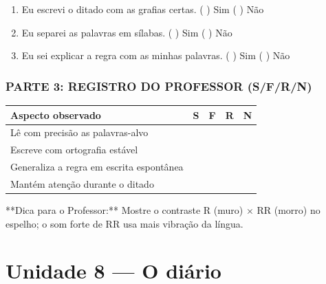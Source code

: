 \begin{exercicio}
\begin{enumerate}[label=\alph*)]
  \item Eu escrevi o ditado com as grafias certas.  \quad ( ) Sim   ( ) Não

  \item Eu separei as palavras em sílabas.  \quad ( ) Sim   ( ) Não

  \item Eu sei explicar a regra com as minhas palavras.  \quad ( ) Sim   ( ) Não

\end{enumerate}

\subsection*{PARTE 3: REGISTRO DO PROFESSOR (S/F/R/N)}

\begin{center}
\renewcommand{\arraystretch}{1.4}
\begin{tabular}{@{}p{9cm}cccc@{}}
\toprule
Aspecto observado & S & F & R & N \\
\midrule
Lê com precisão as palavras-alvo & & & & \\
Escreve com ortografia estável & & & & \\
Generaliza a regra em escrita espontânea & & & & \\
Mantém atenção durante o ditado & & & & \\
\bottomrule\end{tabular}\end{center}

\end{exercicio}

\begin{dica}
**Dica para o Professor:** Mostre o contraste R (muro) × RR (morro) no espelho; o som forte de RR usa mais vibração da língua.
\end{dica}



\chapter{Unidade 8 --- O diário}


